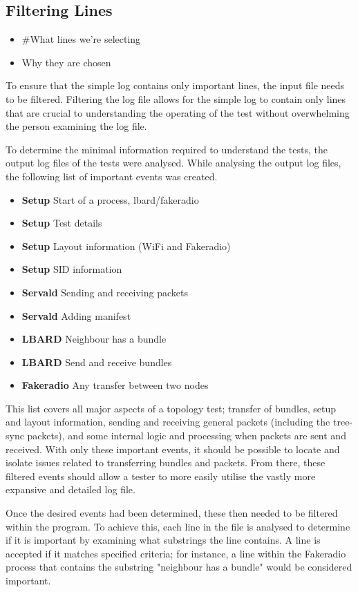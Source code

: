 \subsection{Filtering Lines}
\begin{itemize}
    \item \#What lines we're selecting
    \item Why they are chosen
\end{itemize}

To ensure that the simple log contains only important lines, the input file needs to be filtered.
Filtering the log file allows for the simple log to contain only lines that are crucial to understanding the operating of the test without overwhelming the person examining the log file.

To determine the minimal information required to understand the tests, the output log files of the tests were analysed.
While analysing the output log files, the following list of important events was created.
\begin{itemize}
    \item \textbf{Setup} Start of a process, lbard/fakeradio
    \item \textbf{Setup} Test details
    \item \textbf{Setup} Layout information (WiFi and Fakeradio)
    \item \textbf{Setup} SID information
    \item \textbf{Servald} Sending and receiving packets
    \item \textbf{Servald} Adding manifest
    \item \textbf{LBARD} Neighbour has a bundle
    \item \textbf{LBARD} Send and receive bundles
    \item \textbf{Fakeradio} Any transfer between two nodes
\end{itemize}
This list covers all major aspects of a topology test; transfer of bundles, setup and layout information, sending and receiving general packets (including the tree-sync packets), and some internal logic and processing when packets are sent and received.
With only these important events, it should be possible to locate and isolate issues related to transferring bundles and packets. 
From there, these filtered events should allow a tester to more easily utilise the vastly more expansive and detailed log file. 


Once the desired events had been determined, these then needed to be filtered within the program.
To achieve this, each line in the file is analysed to determine if it is important by examining what substrings the line contains.
A line is accepted if it matches specified criteria; for instance, a line within the Fakeradio process that contains the substring "neighbour has a bundle" would be considered important.

